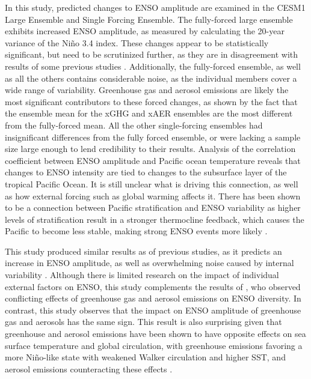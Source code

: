 \documentclass[11pt]{article}
\begin{document}
In this study, predicted changes to ENSO amplitude are examined in the CESM1 Large Ensemble and Single Forcing Ensemble. The fully-forced large ensemble exhibits increased ENSO amplitude, as measured by calculating the 20-year variance of the Niño 3.4 index. These changes appear to be statistically significant, but need to be scrutinized further, as they are in disagreement with results of some previous studies \citep{stevenson2012significant}. Additionally, the fully-forced ensemble, as well as all the others contains considerable noise, as the individual members cover a wide range of variability. Greenhouse gas and aerosol emissions are likely the most significant contributors to these forced changes, as shown by the fact that the ensemble mean for the xGHG and xAER ensembles are the most different from the fully-forced mean. All the other single-forcing ensembles had insignificant differences from the fully forced ensemble, or were lacking a sample size large enough to lend credibility to their results. Analysis of the correlation coefficient between ENSO amplitude and Pacific ocean temperature reveals that changes to ENSO intensity are tied to changes to the subsurface layer of the tropical Pacific Ocean. It is still unclear what is driving this connection, as well as how external forcing such as global warming affects it. There has been shown to be a connection between Pacific stratification and ENSO variability as higher levels of stratification result in a stronger thermocline feedback, which causes the Pacific to become less stable, making strong ENSO events more likely \citep{dewitte2013reinterpreting}.

This study produced similar results as of previous studies, as it predicts an increase in ENSO amplitude, as well as overwhelming noise caused by internal variability \citep{maher2018enso}. Although there is limited research on the impact of individual external factors on ENSO, this study complements the results of \citet{stevenson2019forced}, who observed conflicting effects of greenhouse gas and aerosol emissions on ENSO diversity. In contrast, this study observes that the impact on ENSO amplitude of greenhouse gas and aerosols has the same sign. This result is also surprising given that greenhouse and aerosol emissions have been shown to have opposite effects on sea surface temperature and global circulation, with greenhouse emissions favoring a more Niño-like state with weakened Walker circulation and higher SST, and aerosol emissions counteracting these effects \citep{boer2000transient}.
\end{document}
